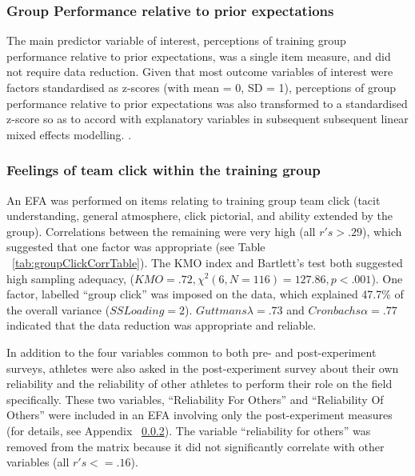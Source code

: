 \subsubsection{Group Performance relative to prior expectations}
The main predictor variable of interest, perceptions of training group performance relative to prior expectations, was a single item measure, and did not require data reduction.  Given that most outcome variables of interest were factors standardised as z-scores (with mean = 0, SD = 1), perceptions of group performance relative to prior expectations was also transformed to a standardised z-score so as to accord with explanatory variables in subsequent subsequent linear mixed effects modelling. \citep[for an explanation, see][]{}.

\subsubsection{Feelings of team click within the training group}
An EFA was performed on items relating to training group team click (tacit understanding, general atmosphere, click pictorial, and ability extended by the group).  Correlations between the remaining were very high (all $r's > .29$), which suggested that one factor was appropriate (see Table ~\ref{tab:groupClickCorrTable}). The KMO index and Bartlett's test both suggested high sampling adequacy, ($KMO =  .72, \chi^2(6, N = 116) = 127.86, p < .001$). One factor, labelled ``group click'' was imposed on the data, which explained 47.7\% of the overall variance ($SS Loading = 2$). $Guttmans \lambda = .73$ and $Cronbachs \alpha = .77$ indicated that the data reduction was appropriate and reliable.

\begin{landscape}
\centering

 \end{landscape}
\restoregeometry


In addition to the four variables common to both pre- and post-experiment surveys, athletes were also asked in the post-experiment survey about their own reliability and the reliability of other athletes to perform their role on the field specifically. These two variables, ``Reliability For Others'' and ``Reliability Of Others'' were included in an EFA involving only the post-experiment measures (for details, see Appendix ~\ref{}).  The variable ``reliability for others'' was removed from the matrix because it did not significantly correlate with other variables (all $r's <= .16$).

